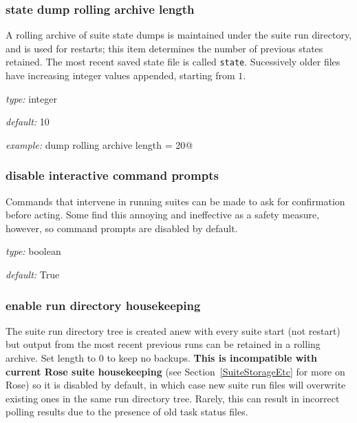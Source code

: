 \subsubsection{state dump rolling archive length}

A rolling archive of suite state dumps is maintained under the suite run
directory, and is used for restarts; this item determines the number of
previous states retained. The most recent saved state file is called
\lstinline=state=. Sucessively older files have increasing integer
values appended, starting from $1$.

\begin{myitemize}
\item {\em type:} integer
\item {\em default:} 10
\item {\em example:} \lstinline@state dump rolling archive length = 20@
\end{myitemize}

\subsubsection{disable interactive command prompts}

Commands that intervene in running suites can be made to ask for
confirmation before acting. Some find this annoying and ineffective as a
safety measure, however, so command prompts are disabled by default.

\begin{myitemize}
\item {\em type:} boolean
\item {\em default:} True
\end{myitemize}

\subsubsection{enable run directory housekeeping}

The suite run directory tree is created anew with every suite start
(not restart) but output from the most recent previous runs can be
retained in a rolling archive. Set length to 0 to keep no backups.
{\bf This is incompatible with current Rose suite housekeeping} (see
Section~\ref{SuiteStorageEtc} for more on Rose) so it is disabled by
default, in which case new suite run files will overwrite existing ones
in the same run directory tree. Rarely, this can result in incorrect
polling results due to the presence of old task status files.

